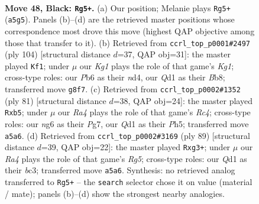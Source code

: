 \documentclass[11pt]{article}
\begin{document}
\clearpage

\begin{figure}[p]\centering
\begin{subfigure}{0.46\textwidth}\centering
\resizebox{\linewidth}{!}{%
\newchessgame
\chessboard[
  setfen={6k1/2r3p1/1p4N1/r7/P2pp3/7R/5PK1/3q4 b - - 1 48},
  showmover=false,
  pgfstyle=straightmove, color=movearrow, markmove={a5-g5}
]}
\caption{}
\end{subfigure}\hfill
\begin{subfigure}{0.46\textwidth}\centering
\resizebox{\linewidth}{!}{%
\newchessgame
\chessboard[
  setfen={1B6/1p6/1R6/6k1/1P1n2p1/6P1/1Pr5/6K1 w - - 7 53},
  showmover=false,
  pgfstyle=straightmove, color=movearrow, markmove={g1-f1}
]}
\caption{}
\end{subfigure}
\\[4pt]
\begin{subfigure}{0.46\textwidth}\centering
\resizebox{\linewidth}{!}{%
\newchessgame
\chessboard[
  setfen={7k/6p1/3p4/1Pr2p1p/5P2/3P3P/5KP1/4R3 b - - 0 41},
  showmover=false,
  pgfstyle=straightmove, color=movearrow, markmove={c5-b5}
]}
\caption{}
\end{subfigure}\hfill
\begin{subfigure}{0.46\textwidth}\centering
\resizebox{\linewidth}{!}{%
\newchessgame
\chessboard[
  setfen={8/6p1/2pk1p2/1p5R/6r1/P1BK2P1/8/8 b - - 0 45},
  showmover=false,
  pgfstyle=straightmove, color=movearrow, markmove={g4-g3}
]}
\caption{}
\end{subfigure}
\caption{\textbf{Move 48, Black: \texttt{Rg5+}.} (a) Our position; Melanie plays \texttt{Rg5+} (\texttt{a5g5}). Panels (b)--(d) are the retrieved master positions whose correspondence most drove this move (highest QAP objective among those that transfer to it). (b) Retrieved from \texttt{ccrl\_top\_p0001\#2497} (ply 104) [structural distance $d$=37, QAP obj=31]: the master played \texttt{Kf1}; under $\mu$ our \emph{Kg1} plays the role of that game's \emph{Kg1}; cross-type roles: our \emph{P}b6 as their \emph{n}d4, our \emph{Q}d1 as their \emph{B}b8; transferred move \texttt{g8f7}. (c) Retrieved from \texttt{ccrl\_top\_p0002\#1352} (ply 81) [structural distance $d$=38, QAP obj=24]: the master played \texttt{Rxb5}; under $\mu$ our \emph{Ra4} plays the role of that game's \emph{Rc4}; cross-type roles: our \emph{n}g6 as their \emph{P}g7, our \emph{Q}d1 as their \emph{P}h5; transferred move \texttt{a5a6}. (d) Retrieved from \texttt{ccrl\_top\_p0002\#3169} (ply 89) [structural distance $d$=39, QAP obj=22]: the master played \texttt{Rxg3+}; under $\mu$ our \emph{Ra4} plays the role of that game's \emph{Rg5}; cross-type roles: our \emph{Q}d1 as their \emph{b}c3; transferred move \texttt{a5a6}. Synthesis: no retrieved analog transferred to \texttt{Rg5+} -- the \texttt{search} selector chose it on value (material / mate); panels (b)--(d) show the strongest nearby analogies.}
\label{fig:thought-m95}
\end{figure}
\end{document}
